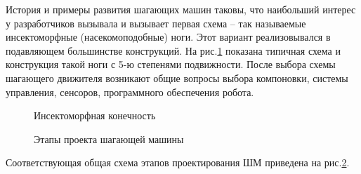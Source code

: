 История и примеры развития шагающих машин таковы, что наибольший интерес у разработчиков вызывала и вызывает первая схема – так называемые инсектоморфные (насекомоподобные) ноги. Этот вариант реализовывался в подавляющем большинстве конструкций. На рис.\ref{fig29} показана типичная схема и конструкция такой ноги с 5-ю степенями подвижности.
После выбора схемы шагающего движителя возникают общие вопросы выбора компоновки, системы управления, сенсоров, программного обеспечения робота.
\begin{figure}[here]
\begin{minipage}{0.49\linewidth}
\end{minipage}
\hfill
\begin{minipage}{0.49\linewidth}
\end{minipage}
\caption{Инсектоморфная конечность}
\label{fig29}
\end{figure}

\begin{figure}[here]
\caption{Этапы проекта шагающей машины}
\label{fig30}
\end{figure} 

Соответствующая общая схема этапов проектирования ШМ приведена на рис.\ref{fig30}.

